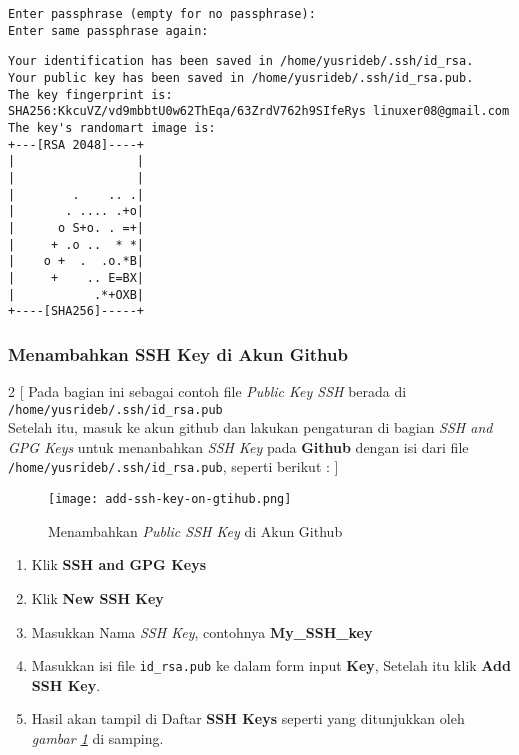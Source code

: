\begin{lstlisting}[language=ShellBash]
Enter passphrase (empty for no passphrase):
Enter same passphrase again: 
\end{lstlisting}
\begin{lstlisting}[language=ShellBash]
Your identification has been saved in /home/yusrideb/.ssh/id_rsa.
Your public key has been saved in /home/yusrideb/.ssh/id_rsa.pub.
The key fingerprint is:
SHA256:KkcuVZ/vd9mbbtU0w62ThEqa/63ZrdV762h9SIfeRys linuxer08@gmail.com
The key's randomart image is:
+---[RSA 2048]----+
|                 |
|                 |
|        .    .. .|
|       . .... .+o|
|      o S+o. . =+|
|     + .o ..  * *|
|    o +  .  .o.*B|
|     +    .. E=BX|
|           .*+OXB|
+----[SHA256]-----+
\end{lstlisting}

\pagebreak
\subsubsection{Menambahkan SSH Key di Akun Github}

\begin{multicols}{2}
[
\noindent
Pada bagian ini sebagai contoh file \textit{Public Key SSH} berada di\\ \texttt{/home/yusrideb/.ssh/id\_rsa.pub}\\
Setelah itu, masuk ke akun github dan lakukan pengaturan di bagian \textit{SSH and GPG Keys} untuk menanbahkan \textit{SSH Key} pada \textbf{Github} dengan isi dari file\\ \texttt{/home/yusrideb/.ssh/id\_rsa.pub}, seperti berikut :
]
\begin{figure}[H]
	\centering
	\texttt{[image: add-ssh-key-on-gtihub.png]}
	\caption{Menambahkan \textit{Public SSH Key} di Akun Github}
	\label{fig:bab2_add-ssh-key-on-github}
\end{figure}

\begin{enumerate}
	\item Klik \textbf{SSH and GPG Keys}
	
	\item Klik \textbf{New SSH Key}
	
	\item Masukkan Nama \textit{SSH Key}, contohnya \textbf{My\_SSH\_key}
	
	\item Masukkan isi file \texttt{id\_rsa.pub} ke dalam form input \textbf{Key},
	Setelah itu klik \textbf{Add SSH Key}.
	
	\item Hasil akan tampil di Daftar \textbf{SSH Keys} seperti yang ditunjukkan oleh \textit{gambar \ref{fig:bab2_add-ssh-key-on-github}} di samping.
\end{enumerate}

\end{multicols}

